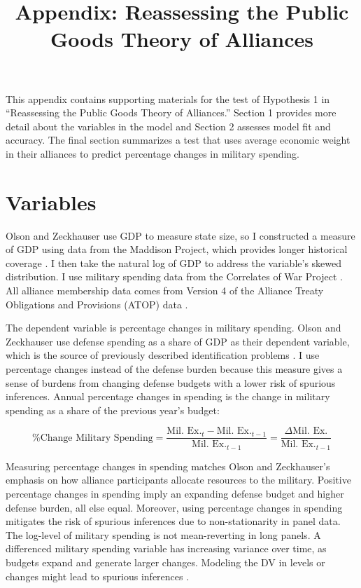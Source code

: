 \documentclass[12pt]{article}
\title{
\textbf{Appendix: Reassessing the Public Goods Theory of Alliances}
	}
\begin{document}
\maketitle 

\doublespace

This appendix contains supporting materials for the test of Hypothesis 1 in ``Reassessing the Public Goods Theory of Alliances.'' 
Section 1 provides more detail about the variables in the model and Section 2 assesses model fit and accuracy. 
The final section summarizes a test that uses average economic weight in their alliances to predict percentage changes in military spending. 


\section{Variables} 


Olson and Zeckhauser use GDP to measure state size, so I constructed a measure of GDP using data from the Maddison Project, which provides longer historical coverage \citep{Boltetal2018}. 
I then take the natural log of GDP to address the variable's skewed distribution. 
I use military spending data from the Correlates of War Project \citep{SingerCINC1988}.  
All alliance membership data comes from Version 4 of the Alliance Treaty Obligations and Provisions (ATOP) data \citep{Leedsetal2002}.  


The dependent variable is percentage changes in military spending. 
Olson and Zeckhauser use defense spending as a share of GDP as their dependent variable, which is the source of previously described identification problems \citep{Kronmal1993, PluemperNeumayer2015}. 
I use percentage changes instead of the defense burden because this measure gives a sense of burdens from changing defense budgets with a lower risk of spurious inferences. 
Annual percentage changes in spending is the change in military spending as a share of the previous year's budget:


\begin{equation}
\mbox{\% Change Military Spending} = \frac{\mbox{Mil. Ex.}_t - \mbox{Mil. Ex.}_{t-1} }{ \mbox{Mil. Ex.}_{t-1} } = \frac{\Delta \mbox{Mil. Ex.} }{ \mbox{Mil. Ex.}_{t-1} }
\end{equation} 


Measuring percentage changes in spending matches Olson and Zeckhauser's emphasis on how alliance participants allocate resources to the military.
Positive percentage changes in spending imply an expanding defense budget and higher defense burden, all else equal.
Moreover, using percentage changes in spending mitigates the risk of spurious inferences due to non-stationarity in panel data. 
The log-level of military spending is not mean-reverting in long panels.
A differenced military spending variable has increasing variance over time, as budgets expand and generate larger changes. 
Modeling the DV in levels or changes might lead to spurious inferences \citep{GrangerNewbold1974}. 
\end{document}
